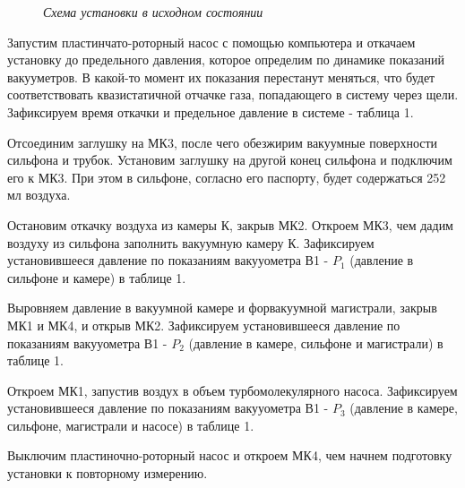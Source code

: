 \documentclass[a4paper, fontsize = 14pt]{article}
\begin{document}
\begin{figure}[hbt]\label{risII}
\caption{\textit{Схема установки в исходном состоянии}}
\end{figure}

Запустим пластинчато-роторный насос с помощью компьютера и откачаем установку до предельного давления, которое определим по динамике показаний вакууметров. В какой-то момент их показания перестанут меняться, что будет соответствовать квазистатичной отчачке газа, попадающего в систему через щели. Зафиксируем время откачки и предельное давление в системе - таблица 1.

Отсоединим заглушку на МК3, после чего обезжирим вакуумные поверхности сильфона и трубок. Установим заглушку на другой конец сильфона и подключим его к МК3. При этом в сильфоне, согласно его паспорту, будет содержаться 252 мл воздуха. 

Остановим откачку воздуха из камеры К, закрыв МК2. Откроем МК3, чем дадим воздуху из сильфона заполнить вакуумную камеру К. Зафиксируем установившееся давление по показаниям вакууометра В1 - $P_{1}$ (давление в сильфоне и камере) в таблице 1. 

Выровняем давление в вакуумной камере и форвакуумной магистрали, закрыв МК1 и МК4, и открыв МК2. Зафиксируем установившееся давление по показаниям вакууометра В1 - $P_{2}$ (давление в камере, сильфоне и магистрали) в таблице 1. 

Откроем МК1, запустив воздух в объем турбомолекулярного насоса. Зафиксируем установившееся давление по показаниям вакууометра В1 - $P_{3}$ (давление в камере, сильфоне, магистрали и насосе) в таблице 1. 

Выключим пластиночно-роторный насос и откроем МК4, чем начнем подготовку установки к повторному измерению.  
\end{document}
